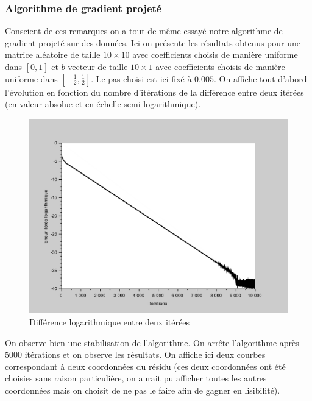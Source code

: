 \documentclass[10pt,a4paper]{article}
\begin{document}
\subsubsection{Algorithme de gradient projeté}
Conscient de ces remarques on a tout de même essayé notre algorithme de gradient projeté sur des données. Ici on présente les résultats obtenus pour une matrice aléatoire de taille $10 \times 10$ avec coefficients choisis de manière uniforme dans $[0,1]$ et $b$ vecteur de taille $10 \times 1$ avec coefficients choisis de manière uniforme dans $[-\frac{1}{2}, \frac{1}{2}]$. Le pas choisi est ici fixé à $0.005$. On affiche tout d'abord l'évolution en fonction du nombre d'itérations de la différence entre deux itérées (en valeur absolue et en échelle semi-logarithmique).

\begin{figure}[H]
\centering
\includegraphics[scale=0.5]{gradproj_erreur.pdf}
\caption{Différence logarithmique entre deux itérées}
\end{figure}

On observe bien une stabilisation de l'algorithme.
On arrête l'algorithme après $5000$ itérations et on observe les résultats. On affiche ici deux courbes correspondant à deux coordonnées du résidu (ces deux coordonnées ont été choisies sans raison particulière, on aurait pu afficher toutes les autres coordonnées mais on choisit de ne pas le faire afin de gagner en lisibilité).
\end{document}
